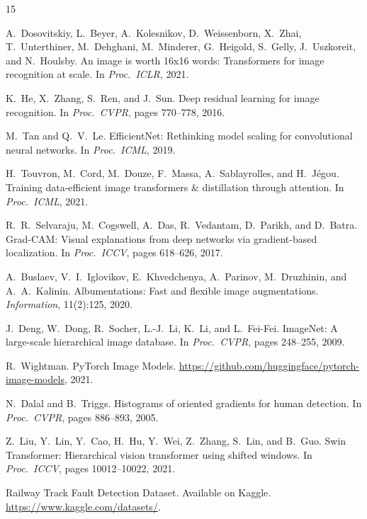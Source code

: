 \documentclass[10pt,twocolumn,letterpaper]{article}
\begin{document}
{\small

\begin{thebibliography}{15}

A.~Dosovitskiy, L.~Beyer, A.~Kolesnikov, D.~Weissenborn, X.~Zhai, T.~Unterthiner, M.~Dehghani, M.~Minderer, G.~Heigold, S.~Gelly, J.~Uszkoreit, and N.~Houlsby.
\newblock An image is worth 16x16 words: Transformers for image recognition at scale.
\newblock In \textit{Proc.\ ICLR}, 2021.

K.~He, X.~Zhang, S.~Ren, and J.~Sun.
\newblock Deep residual learning for image recognition.
\newblock In \textit{Proc.\ CVPR}, pages 770--778, 2016.

M.~Tan and Q.~V.~Le.
\newblock EfficientNet: Rethinking model scaling for convolutional neural networks.
\newblock In \textit{Proc.\ ICML}, 2019.

H.~Touvron, M.~Cord, M.~Douze, F.~Massa, A.~Sablayrolles, and H.~J{\'e}gou.
\newblock Training data-efficient image transformers \& distillation through attention.
\newblock In \textit{Proc.\ ICML}, 2021.

R.~R.~Selvaraju, M.~Cogswell, A.~Das, R.~Vedantam, D.~Parikh, and D.~Batra.
\newblock Grad-CAM: Visual explanations from deep networks via gradient-based localization.
\newblock In \textit{Proc.\ ICCV}, pages 618--626, 2017.

A.~Buslaev, V.~I.~Iglovikov, E.~Khvedchenya, A.~Parinov, M.~Druzhinin, and A.~A.~Kalinin.
\newblock Albumentations: Fast and flexible image augmentations.
\newblock \textit{Information}, 11(2):125, 2020.

J.~Deng, W.~Dong, R.~Socher, L.-J.~Li, K.~Li, and L.~Fei-Fei.
\newblock ImageNet: A large-scale hierarchical image database.
\newblock In \textit{Proc.\ CVPR}, pages 248--255, 2009.

R.~Wightman.
\newblock PyTorch Image Models.
\newblock \url{https://github.com/huggingface/pytorch-image-models}, 2021.

N.~Dalal and B.~Triggs.
\newblock Histograms of oriented gradients for human detection.
\newblock In \textit{Proc.\ CVPR}, pages 886--893, 2005.

Z.~Liu, Y.~Lin, Y.~Cao, H.~Hu, Y.~Wei, Z.~Zhang, S.~Lin, and B.~Guo.
\newblock Swin Transformer: Hierarchical vision transformer using shifted windows.
\newblock In \textit{Proc.\ ICCV}, pages 10012--10022, 2021.

Railway Track Fault Detection Dataset.
\newblock Available on Kaggle.
\newblock \url{https://www.kaggle.com/datasets/}.

\end{thebibliography}
}
\end{document}
